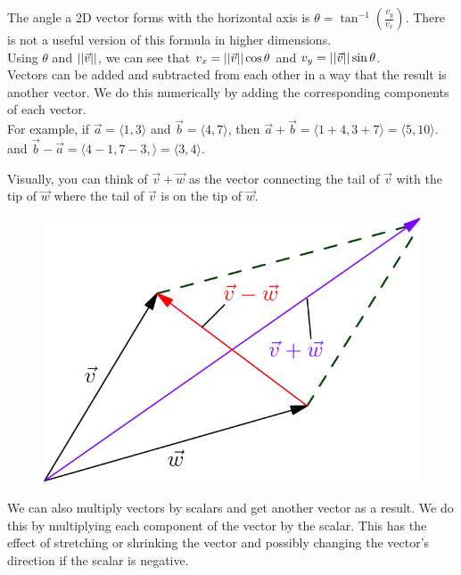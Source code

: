 \noindent
The angle a 2D vector forms with the horizontal axis is $\theta = \tan^{-1}{\left(\frac{v_y}{v_x}\right)}$. There is not a useful version of this formula in higher dimensions.\\
Using $\theta$ and $\left|\left|\vec{v}\right|\right|$, we can see that $v_x=\left|\left|\vec{v}\right|\right|\cos{\theta}$ and $v_y=\left|\left|\vec{v}\right|\right|\sin{\theta}$.\\

\noindent
Vectors can be added and subtracted from each other in a way that the result is another vector. We do this numerically by adding the corresponding components of each vector.\\
For example, if $\vec{a}=\langle 1,3 \rangle$ and $\vec{b}=\langle 4,7 \rangle$, then $\vec{a}+\vec{b}=\langle 1+4, 3+7 \rangle = \langle 5,10 \rangle$.\\
and $\vec{b}-\vec{a}=\langle 4-1, 7-3, \rangle=\langle 3,4 \rangle$.

\noindent
Visually, you can think of $\vec{v}+\vec{w}$ as the vector connecting the tail of $\vec{v}$ with the tip of $\vec{w}$ where the tail of $\vec{v}$ is on the tip of $\vec{w}$.

\begin{figure}[h]
	\centering
	\includegraphics[scale=0.33]{Images/backgroundReview/Parallelogram}
\end{figure}

\noindent
We can also multiply vectors by scalars and get another vector as a result. We do this by multiplying each component of the vector by the scalar. This has the effect of stretching or shrinking the vector and possibly changing the vector's direction if the scalar is negative.

